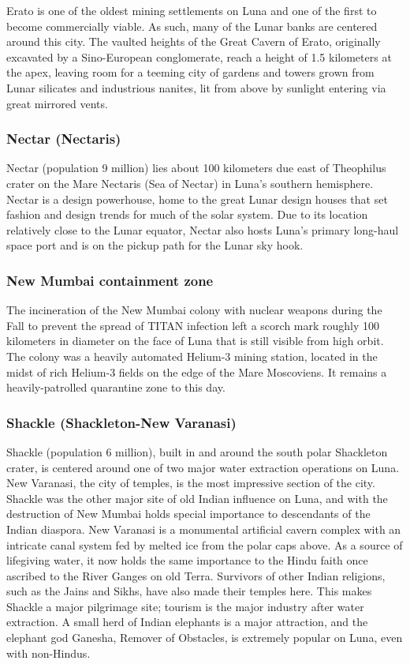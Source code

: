 Erato is one of the oldest mining settlements on Luna and one of the first to become commercially viable. As such, many of the Lunar banks are centered around this city. The vaulted heights of the Great Cavern of Erato, originally excavated by a Sino-European conglomerate, reach a height of 1.5 kilometers at the apex, leaving room for a teeming city of gardens and towers grown from Lunar silicates and industrious nanites, lit from above by sunlight entering via great mirrored vents. 

\subsubsection{Nectar (Nectaris)} \label{sec:nectar-nectaris} 

Nectar (population 9 million) lies about 100 kilometers due east of Theophilus crater on the Mare Nectaris (Sea of Nectar) in Luna's southern hemisphere. Nectar is a design powerhouse, home to the great Lunar design houses that set fashion and design trends for much of the solar system. Due to its location relatively close to the Lunar equator, Nectar also hosts Luna's primary long-haul space port and is on the pickup path for the Lunar sky hook. 

\subsubsection{New Mumbai containment zone} \label{sec:new-mumb-cont} 

The incineration of the New Mumbai colony with nuclear weapons during the Fall to prevent the spread of TITAN infection left a scorch mark roughly 100 kilometers in diameter on the face of Luna that is still visible from high orbit. The colony was a heavily automated Helium-3 mining station, located in the midst of rich Helium-3 fields on the edge of the Mare Moscoviens. It remains a heavily-patrolled quarantine zone to this day. 

\subsubsection{Shackle (Shackleton-New Varanasi)} \label{sec:shackle-shackl-new} 

Shackle (population 6 million), built in and around the south polar Shackleton crater, is centered around one of two major water extraction operations on Luna. New Varanasi, the city of temples, is the most impressive section of the city. Shackle was the other major site of old Indian influence on Luna, and with the destruction of New Mumbai holds special importance to descendants of the Indian diaspora. New Varanasi is a monumental artificial cavern complex with an intricate canal system fed by melted ice from the polar caps above. As a source of lifegiving water, it now holds the same importance to the Hindu faith once ascribed to the River Ganges on old Terra. Survivors of other Indian religions, such as the Jains and Sikhs, have also made their temples here. This makes Shackle a major pilgrimage site; tourism is the major industry after water extraction. A small herd of Indian elephants is a major attraction, and the elephant god Ganesha, Remover of Obstacles, is extremely popular on Luna, even with non-Hindus. 

